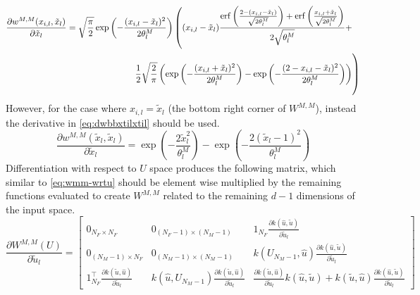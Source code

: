 \documentclass[
]{article}
\begin{document}
\begin{equation}
\begin{split}
\frac{\partial w^{M,M}(x_{i,l}, \tilde{x}_l)}{\partial \tilde{x}_l} &= \sqrt{\frac{\pi}{2}}\exp\left(-\frac{(x_{i,l} - \tilde{x}_l)^2}{2\theta^M_l}\right)\left((x_{i,l} - \tilde{x}_l)\frac{ \mathrm{erf}\left( \frac{2-(x_{i,l}-\tilde{x}_l)}{\sqrt{2\theta^M_l}}\right) + \mathrm{erf}\left(\frac{x_{i,l}+\tilde{x}_l}{\sqrt{2\theta^M_l}}\right)}{2\sqrt{\theta^M_l}} + \right. \\ 
&\left. \phantom{\frac{ \mathrm{erf}\left( \frac{2-(x_{i,l}-\tilde{x}_l)}{\sqrt{2\theta^M_l}}\right)}{2\sqrt{\theta^M_l}}} \frac{1}{2}\sqrt{\frac{2}{\pi}}\left(\exp\left(-\frac{(x_{i,l}+\tilde{x}_l)^2}{2\theta^M_l}\right) - \exp\left(-\frac{(2-x_{i,l}-\tilde{x}_l)^2}{2\theta^M_l}\right)\right)\right)
\end{split}
\notag
\end{equation}
However, for the
case where \(x_{i,l} = \tilde{x}_l\) (the bottom right corner of \(W^{M,M}\)), instead the derivative in
\eqref{eq:dwbbxtilxtil} should be used.
\begin{equation}
\frac{\partial w^{M,M}(\tilde{x}_l, \tilde{x}_l)}{\partial \tilde{x}_l} = \exp\left(-\frac{2\tilde{x}_l^2}{\theta^M_l}\right) - \exp\left(-\frac{2(\tilde{x}_l-1)^2}{\theta^M_l}\right)
\label{eq:dwbbxtilxtil}
\end{equation}
Differentiation with respect to \(U\) space produces the following matrix, which similar to \eqref{eq:wmm-wrtu} should be element wise multiplied by the remaining functions evaluated to create \(W^{M,M}\) related to the remaining \(d-1\) dimensions of the input space.
\begin{equation}
\frac{\partial W^{M,M}(U)}{\partial \tilde{u}_l}=
\begin{bmatrix}
0_{N_F \times N_F} & 0_{(N_F - 1) \times (N_M -1)} & 1_{N_F} \frac{\partial k(\hat{u}, \tilde{u})}{\partial \tilde{u}_l}\\
0_{(N_M -1) \times N_F} & 0_{(N_M - 1)\times (N_M -1)} & k(U_{N_M -1}, \hat{u})\frac{\partial k(\hat{u}, \tilde{u})}{\partial \tilde{u}_l}\\
1_{N_F}^{\top} \frac{\partial k(\tilde{u}, \hat{u})}{\partial \tilde{u}_l} & k(\hat{u}, U_{N_M -1})\frac{\partial k( \tilde{u}, \hat{u})}{\partial \tilde{u}_l} & \frac{\partial k(\tilde{u}, \hat{u})}{\partial \tilde{u}_l}k(\hat{u}, \tilde{u}) + k(\tilde{u}, \hat{u})\frac{\partial k(\hat{u}, \tilde{u})}{\partial \tilde{u}_l}
\end{bmatrix}
\label{eq:dwmm-du}
\end{equation}
\end{document}
